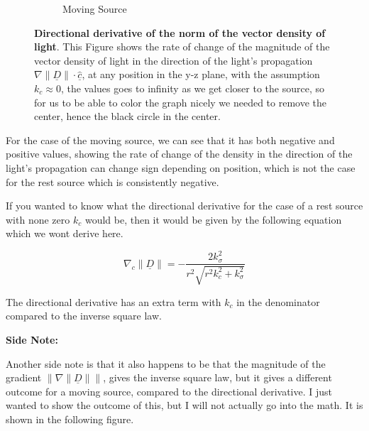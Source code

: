 \begin{figure}[H]
\begin{subfigure}{0.45\textwidth}
		\caption{Moving Source}
		\label{subfig_2: directional derivative of vector density norm}
	\end{subfigure}
	\caption{\textbf{Directional derivative of the norm of the vector density of light}. This Figure shows the rate of change of the magnitude of the vector density of light in the direction of the light's propagation $\nabla \| \underline{D} \| \cdot \hat{\underline{c}}$, at any position in the y-z plane, with the assumption $k_c\approx 0$, the values goes to infinity as we get closer to the source, so for us to be able to color the graph nicely we needed to remove the center, hence the black circle in the center.}
	\label{fig: directional derivative of vector density norm}
\end{figure}

For the case of the moving source, we can see that it has both negative and positive values, showing the rate of change of the density in the direction of the light's propagation can change sign depending on position, which is not the case for the rest source which is consistently negative.

If you wanted to know what the directional derivative for the case of a rest source with none zero $k_c$ would be, then it would be given by the following equation which we wont derive here.

\begin{equation}
	\nabla_c \| \underline{D} \| = - \frac{2 k_\sigma^2}{r^2\sqrt{r^2 k_c^2 + k_\sigma^2}}
\end{equation}

The directional derivative has an extra term with $k_c$ in the denominator compared to the inverse square law.

\textbf{Side Note:}

Another side note is that it also happens to be that the magnitude of the gradient $\Big\| \nabla \| \underline{D} \| \Big\|$, gives the inverse square law, but it gives a different outcome for a moving source, compared to the directional derivative.
I just wanted to show the outcome of this, but I will not actually go into the math.
It is shown in the following figure.

